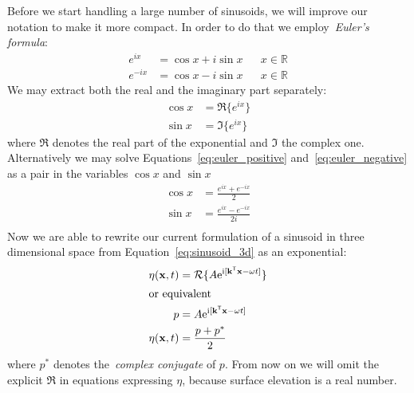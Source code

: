 Before we start handling a large number of sinusoids, we will improve our
notation to make it more compact. In order to do that we employ~\emph{Euler's
formula}:
\begin{align}
\label{eq:euler_positive} e^{ix} &= \cos{x} + i\sin{x} && x \in \mathbb{R} \\
\label{eq:euler_negative} e^{-ix} &= \cos{x} - i\sin{x} && x \in \mathbb{R}
\end{align}
%
We may extract both the real and the imaginary part separately:
\begin{align*}
 \cos{x} &= \Re\{e^{ix}\} \\
 \sin{x} &= \Im\{e^{ix}\}
\end{align*}
where $\Re$ denotes the real part of the exponential and $\Im$ the
complex one. Alternatively we may solve Equations~\ref{eq:euler_positive}
and~\ref{eq:euler_negative} as a pair in the variables $\cos{x}$ and $\sin{x}$
\begin{align*}
 \cos{x} &= \frac{e^{ix}+e^{-ix}}{2}\\
 \sin{x} &= \frac{e^{ix}-e^{-ix}}{2i}\\
\end{align*}
Now we are able to rewrite our current formulation of a sinusoid in three
dimensional space from Equation~\ref{eq:sinusoid_3d} as an exponential:
%
\begin{align}
\label{eq:sinusoid_exponential_sa} \eta(\mathbf{x}, t) &=
\mathcal{R}\{A\mathrm{e}^{\mathrm{i}[\mathbf{k}^{\mathsf{T}}\mathbf{x} -{\omega}t]}\} \\
\intertext{or equivalent}
 p &= A\mathrm{e}^{\mathrm{i}[\mathbf{k}^{\mathsf{T}}\mathbf{x} -
{\omega}t]} \\
 \eta(\mathbf{x}, t) &= \frac{p+p^*}{2}
\end{align}
%
where $p^*$ denotes the~\emph{complex conjugate} of $p$. From now on we will
omit the explicit $\Re$ in equations expressing $\eta$, because surface
elevation is a real number.\\

